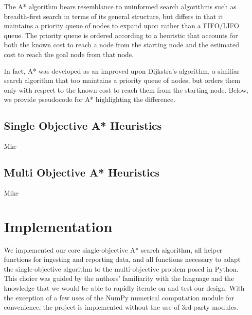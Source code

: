 \documentclass[12pt, conference, compsocconf]{IEEEtran}
\newcommand*\Let[2]{\State #1 $\gets$ #2}
\begin{document}
The A* algorithm bears resemblance to uninformed search algorithms such as breadth-first search in terms of its general structure, but differs in that it maintains a priority queue of nodes to expand upon rather than a FIFO/LIFO queue. 
The priority queue is ordered according to a heuristic that accounts for both the known cost to reach a node from the starting node and the estimated cost to reach the goal node from that node. 

In fact, A* was developed as an improved upon Dijkstra's algorithm, a similiar search algorithm that too maintains a priority queue of nodes, but orders them only with respect to the known cost to reach them from the starting node. 
Below, we provide pseudocode for A* highlighting the difference.

%            
            
            

\subsection{Single Objective A* Heuristics}
Mke

\subsection{Multi Objective A* Heuristics}
Mike

\section{Implementation}
We implemented our core single-objective A* search algorithm, all helper functions for ingesting and reporting data, and all functions necessary to adapt the single-objective algorithm to the multi-objective problem posed in Python. 
This choice was guided by the authors' familiarity with the language and the knowledge that we would be able to rapidly iterate on and test our design.
With the exception of a few uses of the NumPy numerical computation module for convenience, the project is implemented without the use of 3rd-party modules. 
\end{document}
